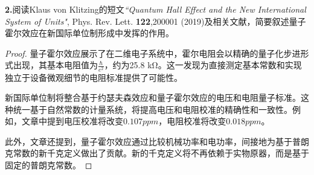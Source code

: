 \documentclass[reqno,a4paper,12pt]{amsart}
\begin{document}
\textbf{2.}阅读Klaus von Klitzing的短文\emph{“Quantum Hall Effect and the New International System of Units"}, Phys. Rev. Lett. \textbf{122},200001 (2019)及相关文献，简要叙述量子霍尔效应在新国际单位制形成中发挥的作用。

\begin{proof}

量子霍尔效应展示了在二维电子系统中，霍尔电阻会以精确的量子化步进形式出现，其基本电阻值为$\frac{\hbar}{e^2}$，约为25.8 kΩ。这一发现为直接测定基本常数和实现独立于设备微观细节的电阻标准提供了可能性。

新国际单位制将整合基于约瑟夫森效应和量子霍尔效应的电压和电阻量子标准。这种统一基于自然常数的计量系统，将提高电压和电阻校准的精确性和一致性。例如，文章中提到电压校准将改变$0.107ppm$，电阻校准将改变$0.018ppm$。

此外，文章还提到，量子霍尔效应通过比较机械功率和电功率，间接地为基于普朗克常数的新千克定义做出了贡献。新的千克定义将不再依赖于实物原器，而是基于固定的普朗克常数。

\end{proof}
\end{document}
